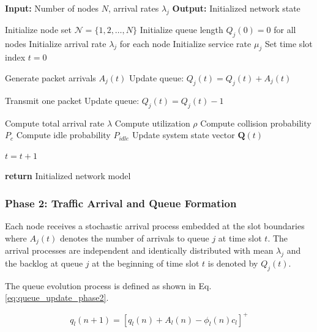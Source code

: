 \documentclass[a4paper,fleqn]{cas-dc}
\numberwithin{equation}{section}
\begin{document}
\begin{algorithm}
\caption{Phase 1: Network Model Initialization}
\begin{algorithmic}

\STATE \textbf{Input:} Number of nodes $N$, arrival rates $\lambda_j$
\STATE \textbf{Output:} Initialized network state

\STATE Initialize node set $\mathcal{N} = \{1,2,\dots,N\}$
\STATE Initialize queue length $Q_j(0) = 0$ for all nodes
\STATE Initialize arrival rate $\lambda_j$ for each node
\STATE Initialize service rate $\mu_j$
\STATE Set time slot index $t = 0$


        \STATE Generate packet arrivals $A_j(t)$
        \STATE Update queue: $Q_j(t) = Q_j(t) + A_j(t)$
        
            \STATE Transmit one packet
            \STATE Update queue: $Q_j(t) = Q_j(t) - 1$
        \ENDIF
        
    \ENDFOR

    \STATE Compute total arrival rate $\lambda$
    \STATE Compute utilization $\rho$
    \STATE Compute collision probability $P_c$
    \STATE Compute idle probability $P_{idle}$
    \STATE Update system state vector $\mathbf{Q}(t)$

    \STATE $t = t + 1$

\ENDWHILE

\STATE \textbf{return} Initialized network model

\end{algorithmic}
\end{algorithm}

\subsubsection{Phase 2: Traffic Arrival and Queue Formation}

Each node receives a stochastic arrival process embedded at the slot boundaries where $A_j(t)$ denotes the number of arrivals to queue $j$ at time slot $t$. The arrival processes are independent and identically distributed with mean $\lambda_j$ and the backlog at queue $j$ at the beginning of time slot $t$ is denoted by $Q_j(t)$. 

The queue evolution process is defined as shown in Eq. \ref{eq:queue_update_phase2}.

\begin{equation}
q_l(n + 1) = [q_l(n) + A_l(n) - \phi_l(n)c_l]^+
\label{eq:queue_update_phase2}
\end{equation}
\end{document}
